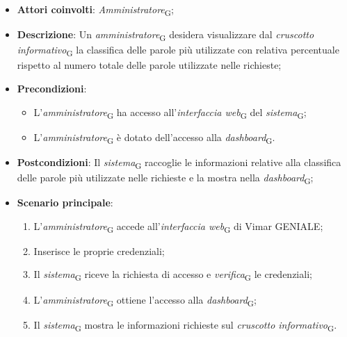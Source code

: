 \begin{itemize}
    \item \textbf{Attori coinvolti}: \textit{Amministratore}\textsubscript{G};
    \item \textbf{Descrizione}: Un \textit{amministratore}\textsubscript{G} desidera visualizzare dal \textit{cruscotto informativo}\textsubscript{G} la classifica delle parole più utilizzate con relativa percentuale rispetto al numero totale delle parole utilizzate nelle richieste;
    \item \textbf{Precondizioni}: 
    \begin{itemize}
        \item L’\textit{amministratore}\textsubscript{G} ha accesso all’\textit{interfaccia web}\textsubscript{G} del \textit{sistema}\textsubscript{G};
        \item L’\textit{amministratore}\textsubscript{G} è dotato dell’accesso alla \textit{dashboard}\textsubscript{G}.
    \end{itemize}
    \item \textbf{Postcondizioni}: Il \textit{sistema}\textsubscript{G} raccoglie le informazioni relative alla classifica delle parole più utilizzate nelle richieste e la mostra nella \textit{dashboard}\textsubscript{G};
    \item \textbf{Scenario principale}:
    \begin{enumerate}
        \item L’\textit{amministratore}\textsubscript{G} accede all’\textit{interfaccia web}\textsubscript{G} di Vimar GENIALE;
        \item Inserisce le proprie credenziali;
        \item Il \textit{sistema}\textsubscript{G} riceve la richiesta di accesso e \textit{verifica}\textsubscript{G} le credenziali;
        \item L’\textit{amministratore}\textsubscript{G} ottiene l’accesso alla \textit{dashboard}\textsubscript{G};
        \item Il \textit{sistema}\textsubscript{G} mostra le informazioni richieste sul \textit{cruscotto informativo}\textsubscript{G}.
    \end{enumerate}
\end{itemize}

